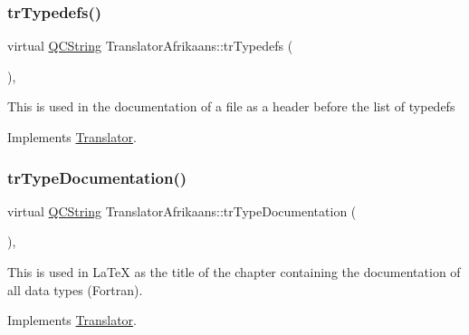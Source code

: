\mbox{\label{class_translator_afrikaans_af915f81f9becf4d64dc5c296a1509512}} 
\subsubsection{\texorpdfstring{trTypedefs()}{trTypedefs()}}
{\footnotesize\ttfamily virtual \mbox{\hyperlink{class_q_c_string}{Q\+C\+String}} Translator\+Afrikaans\+::tr\+Typedefs (\begin{DoxyParamCaption}{ }\end{DoxyParamCaption})\hspace{0.3cm}{\ttfamily [inline]}, {\ttfamily [virtual]}}

This is used in the documentation of a file as a header before the list of typedefs 

Implements \mbox{\hyperlink{class_translator}{Translator}}.

\mbox{\label{class_translator_afrikaans_a6ec57bc3f5f3f990e803f6a65ef18540}} 
\subsubsection{\texorpdfstring{trTypeDocumentation()}{trTypeDocumentation()}}
{\footnotesize\ttfamily virtual \mbox{\hyperlink{class_q_c_string}{Q\+C\+String}} Translator\+Afrikaans\+::tr\+Type\+Documentation (\begin{DoxyParamCaption}{ }\end{DoxyParamCaption})\hspace{0.3cm}{\ttfamily [inline]}, {\ttfamily [virtual]}}

This is used in La\+TeX as the title of the chapter containing the documentation of all data types (Fortran). 

Implements \mbox{\hyperlink{class_translator}{Translator}}.

\mbox{\label{class_translator_afrikaans_ad48918cd7e5efbb7ff5d281f1ea3cf0f}} 
